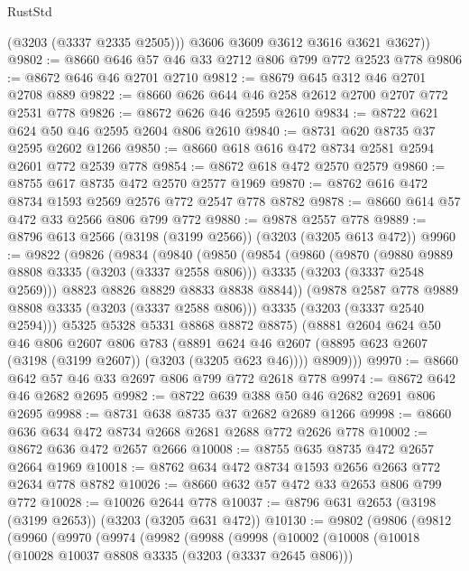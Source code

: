 \begin{lexlean}{RustStd}
\begin{coremodule}
          (@3203 (@3337 @2335 @2505)))
        @3606
        @3609
        @3612
        @3616
        @3621
        @3627))
@9802 := @8660 @646 @57 @46 @33 @2712 @806 @799 @772 @2523 @778
@9806 := @8672 @646 @46 @2701 @2710
@9812 := @8679 @645 @312 @46 @2701 @2708 @889
@9822 := @8660 @626 @644 @46 @258 @2612 @2700 @2707 @772 @2531 @778
@9826 := @8672 @626 @46 @2595 @2610
@9834 := @8722 @621 @624 @50 @46 @2595 @2604 @806 @2610
@9840 := @8731 @620 @8735 @37 @2595 @2602 @1266
@9850 := @8660 @618 @616 @472 @8734 @2581 @2594 @2601 @772 @2539 @778
@9854 := @8672 @618 @472 @2570 @2579
@9860 := @8755 @617 @8735 @472 @2570 @2577 @1969
@9870 := @8762 @616 @472 @8734 @1593 @2569 @2576 @772 @2547 @778 @8782
@9878 := @8660 @614 @57 @472 @33 @2566 @806 @799 @772
@9880 := @9878 @2557 @778
@9889 := @8796 @613 @2566 (@3198 (@3199 @2566)) (@3203 (@3205 @613 @472))
@9960 := @9822
    (@9826
      (@9834
        (@9840
          (@9850
            (@9854
              (@9860
                (@9870
                  (@9880 @9889 @8808 @3335 (@3203 (@3337 @2558 @806)))
                  @3335
                  (@3203 (@3337 @2548 @2569)))
                @8823
                @8826
                @8829
                @8833
                @8838
                @8844))
            (@9878 @2587 @778 @9889 @8808 @3335 (@3203 (@3337 @2588 @806)))
            @3335
            (@3203 (@3337 @2540 @2594)))
          @5325
          @5328
          @5331
          @8868
          @8872
          @8875)
        (@8881
          @2604
          @624
          @50
          @46
          @806
          @2607
          @806
          @783
          (@8891 @624 @46 @2607 (@8895 @623 @2607 (@3198 (@3199 @2607)) (@3203 (@3205 @623 @46))))
          @8909)))
@9970 := @8660 @642 @57 @46 @33 @2697 @806 @799 @772 @2618 @778
@9974 := @8672 @642 @46 @2682 @2695
@9982 := @8722 @639 @388 @50 @46 @2682 @2691 @806 @2695
@9988 := @8731 @638 @8735 @37 @2682 @2689 @1266
@9998 := @8660 @636 @634 @472 @8734 @2668 @2681 @2688 @772 @2626 @778
@10002 := @8672 @636 @472 @2657 @2666
@10008 := @8755 @635 @8735 @472 @2657 @2664 @1969
@10018 := @8762 @634 @472 @8734 @1593 @2656 @2663 @772 @2634 @778 @8782
@10026 := @8660 @632 @57 @472 @33 @2653 @806 @799 @772
@10028 := @10026 @2644 @778
@10037 := @8796 @631 @2653 (@3198 (@3199 @2653)) (@3203 (@3205 @631 @472))
@10130 := @9802
    (@9806
      (@9812
        (@9960
          (@9970
            (@9974
              (@9982
                (@9988
                  (@9998
                    (@10002
                      (@10008
                        (@10018
                          (@10028 @10037 @8808 @3335 (@3203 (@3337 @2645 @806)))

\end{coremodule}
\end{lexlean}
